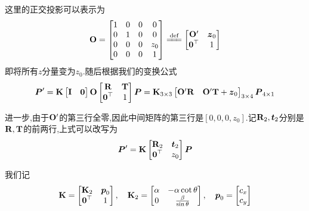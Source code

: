 这里的正交投影可以表示为
\begin{equation}
	\bd O = \begin{bmatrix}
		1 & 0 & 0 & 0
		\\
		0 & 1 & 0 & 0
		\\
		0 & 0 & 0 & z_0
		\\
		0 & 0 & 0 & 1
	\end{bmatrix} \xlongequal{\text{def}} 
	\begin{bmatrix}
		\bd O^\prime & \bm z_0
		\\
		\bm 0^\top & 1
	\end{bmatrix}
\end{equation}
即将所有$z$分量变为$z_0$.随后根据我们的变换公式
\begin{equation}
	\boldsymbol P^\prime = \bold{K} \begin{bmatrix}
		\bold{I} & \boldsymbol 0
	\end{bmatrix} \bold{O} 
	\begin{bmatrix}
		\bold{R} & \bold{T}
		\\
		\boldsymbol 0^\top & 1
	\end{bmatrix}
	\boldsymbol P
	= \bold{K}_{3\times 3} 
	\begin{bmatrix}
		\bold{O}^\prime \bold{R} & \bold{O}^\prime \bold{T} + \boldsymbol z_0
	\end{bmatrix}_{3\times 4} 
	\boldsymbol P_{4\times 1} 
\end{equation}

进一步,由于$\bold{O}^\prime$的第三行全零,因此中间矩阵的第三行是$[0, 0, 0, z_0]$.记$\bold{R}_2, \boldsymbol t_2$分别是$\bold{R}, \bold{T}$的前两行,上式可以改写为
\begin{equation}
	\boldsymbol P^\prime = \bold{K} 
	\begin{bmatrix}
		\bold{R}_2 & \boldsymbol t_2
		\\
		\boldsymbol 0^\top & z_0
	\end{bmatrix}
	\boldsymbol P
\end{equation}

我们记
\begin{equation}
	\bold{K} = 
	\begin{bmatrix}
		\bold{K}_2 & \boldsymbol p_0
		\\
		\boldsymbol 0^\top & 1
	\end{bmatrix}, \quad 
	\bold{K}_2 = 
	\begin{bmatrix}
		\alpha & -\alpha \cot \theta
		\\
		0 & \frac{\beta}{\sin \theta}
	\end{bmatrix}, \quad
	\boldsymbol p_0 = 
	\begin{bmatrix}
		c_x 
		\\
		c_y
	\end{bmatrix}
\end{equation}

